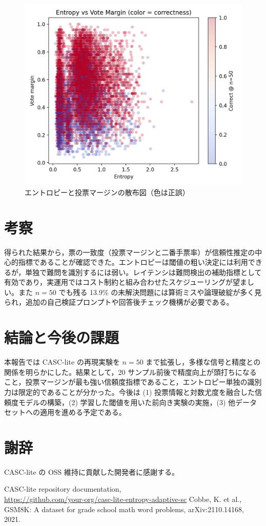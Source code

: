 \documentclass{ipsj}
\begin{document}
\begin{figure}[tb]
  \centering
  \includegraphics[width=0.85\linewidth]{../../figures/n50_batch/entropy_vs_vote_margin_scatter.png}
  \caption{エントロピーと投票マージンの散布図（色は正誤）}
  \label{fig:scatter}
\end{figure}

\section{考察}
得られた結果から，票の一致度（投票マージンと二番手票率）が信頼性推定の中心的指標であることが確認できた。エントロピーは閾値の粗い決定には利用できるが，単独で難問を識別するには弱い。レイテンシは難問検出の補助指標として有効であり，実運用ではコスト制約と組み合わせたスケジューリングが望ましい。また $n=50$ でも残る 13.9\% の未解決問題には算術ミスや論理破綻が多く見られ，追加の自己検証プロンプトや回答後チェック機構が必要である。

\section{結論と今後の課題}
本報告では CASC-lite の再現実験を $n=50$ まで拡張し，多様な信号と精度との関係を明らかにした。結果として，20 サンプル前後で精度向上が頭打ちになること，投票マージンが最も強い信頼度指標であること，エントロピー単独の識別力は限定的であることが分かった。今後は (1) 投票情報と対数尤度を融合した信頼度モデルの構築，(2) 学習した閾値を用いた前向き実験の実施，(3) 他データセットへの適用を進める予定である。

\section*{謝辞}
CASC-lite の OSS 維持に貢献した開発者に感謝する。

\begin{thebibliography}{9}
 CASC-lite repository documentation, \\ \url{https://github.com/your-org/casc-lite-entropy-adaptive-sc}
 Cobbe, K. et al., GSM8K: A dataset for grade school math word problems, arXiv:2110.14168, 2021.
\end{thebibliography}
\end{document}
